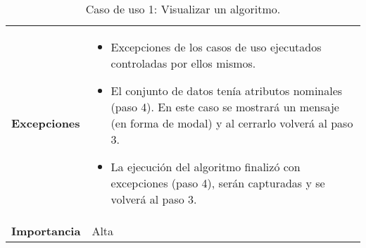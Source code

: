 \begin{table}[p]
\begin{tabularx}{\linewidth}{ p{} p{} }
		\textbf{Excepciones}          & \begin{itemize}
			\item Excepciones de los casos de uso ejecutados controladas por ellos mismos.
			\item El conjunto de datos tenía atributos nominales (paso 4). En este caso se mostrará un mensaje (en forma de modal) y al cerrarlo volverá al paso 3.
			\item La ejecución del algoritmo finalizó con excepciones (paso 4), serán capturadas y se volverá al paso 3.
		\end{itemize}	 \\
		\textbf{Importancia}          & Alta\\
		\bottomrule
	\end{tabularx}
	\caption{Caso de uso 1: Visualizar un algoritmo.}
\end{table}



